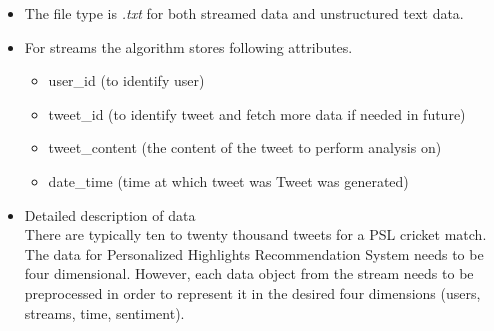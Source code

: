 \documentclass[11pt]{article}
\begin{document}
\begin{itemize}
	\item The file type is \textit{.txt} for both streamed data and unstructured text data.
	\item For streams the algorithm stores following attributes.
	\begin{itemize}
		\item user\_id (to identify user)
		\item tweet\_id (to identify tweet and fetch more data if needed in future)
		\item tweet\_content (the content of the tweet to perform analysis on)
		\item date\_time (time at which tweet was Tweet was generated)
	\end{itemize}
	\item Detailed description of data\\
	There are typically ten to twenty thousand tweets for a PSL cricket match. The data for Personalized Highlights Recommendation System needs to be four dimensional. However, each data object from the stream needs to be preprocessed in order to represent it in the desired four dimensions (users, streams, time, sentiment).
		

\end{itemize}
\end{document}
